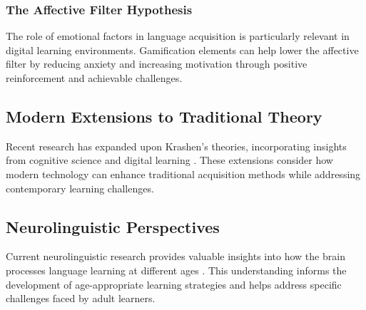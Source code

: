 \subsubsection{The Affective Filter Hypothesis}
The role of emotional factors in language acquisition \citep{krashen1982principles} is particularly relevant in digital learning environments. Gamification elements can help lower the affective filter by reducing anxiety and increasing motivation through positive reinforcement and achievable challenges.

\subsection{Modern Extensions to Traditional Theory}
Recent research has expanded upon Krashen's theories, incorporating insights from cognitive science and digital learning \citep{ellis2015understanding}. These extensions consider how modern technology can enhance traditional acquisition methods while addressing contemporary learning challenges.

\subsection{Neurolinguistic Perspectives}
Current neurolinguistic research provides valuable insights into how the brain processes language learning at different ages \citep{brown2014principles}. This understanding informs the development of age-appropriate learning strategies and helps address specific challenges faced by adult learners. 
